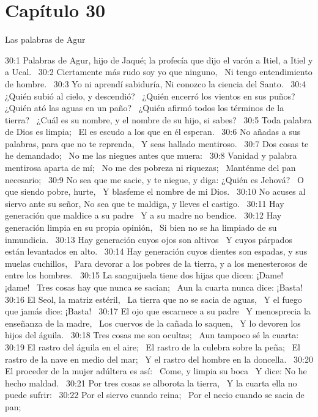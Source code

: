 \section*{Capítulo 30 }
Las palabras de Agur  

30:1 Palabras de Agur, hijo de Jaqué; la profecía que dijo el varón a Itiel, a Itiel y a Ucal.  
30:2 Ciertamente más rudo soy yo que ninguno,  
Ni tengo entendimiento de hombre.  
30:3 Yo ni aprendí sabiduría, 
Ni conozco la ciencia del Santo.  
30:4 ¿Quién subió al cielo, y descendió?  
¿Quién encerró los vientos en sus puños?  
¿Quién ató las aguas en un paño?  
¿Quién afirmó todos los términos de la tierra?  
¿Cuál es su nombre, y el nombre de su hijo, si sabes?  
30:5 Toda palabra de Dios es limpia;  
El es escudo a los que en él esperan.  
30:6 No añadas a sus palabras, para que no te reprenda,  
Y seas hallado mentiroso.  
30:7 Dos cosas te he demandado;  
No me las niegues antes que muera:  
30:8 Vanidad y palabra mentirosa aparta de mí;  
No me des pobreza ni riquezas;  
Manténme del pan necesario;  
30:9 No sea que me sacie, y te niegue, y diga: ¿Quién es Jehová?  
O que siendo pobre, hurte,  
Y blasfeme el nombre de mi Dios.  
30:10 No acuses al siervo ante su señor, 
No sea que te maldiga, y lleves el castigo.  
30:11 Hay generación que maldice a su padre  
Y a su madre no bendice.  
30:12 Hay generación limpia en su propia opinión,  
Si bien no se ha limpiado de su inmundicia.  
30:13 Hay generación cuyos ojos son altivos  
Y cuyos párpados están levantados en alto.  
30:14 Hay generación cuyos dientes son espadas, y sus muelas cuchillos,  
Para devorar a los pobres de la tierra, y a los menesterosos de entre los hombres.  
30:15 La sanguijuela tiene dos hijas que dicen: ¡Dame! ¡dame!  
Tres cosas hay que nunca se sacian;  
Aun la cuarta nunca dice: ¡Basta!  
30:16 El Seol, la matriz estéril,  
La tierra que no se sacia de aguas,  
Y el fuego que jamás dice: ¡Basta!  
30:17 El ojo que escarnece a su padre  
Y menosprecia la enseñanza de la madre,  
Los cuervos de la cañada lo saquen,  
Y lo devoren los hijos del águila.  
30:18 Tres cosas me son ocultas;  
Aun tampoco sé la cuarta:  
30:19 El rastro del águila en el aire;  
El rastro de la culebra sobre la peña;  
El rastro de la nave en medio del mar;  
Y el rastro del hombre en la doncella.  
30:20 El proceder de la mujer adúltera es así:  
Come, y limpia su boca  
Y dice: No he hecho maldad.  
30:21 Por tres cosas se alborota la tierra,  
Y la cuarta ella no puede sufrir:  
30:22 Por el siervo cuando reina;  
Por el necio cuando se sacia de pan;  
